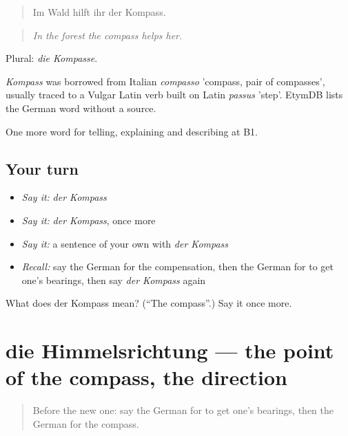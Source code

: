 \begin{quote}
Im Wald hilft ihr der Kompass.
\end{quote}

\begin{quote}
\emph{In the forest the compass helps her.}
\end{quote}

Plural: \emph{die Kompasse}.

\begin{cousinweb}
\emph{Kompass} was borrowed from Italian \emph{compasso} 'compass, pair of compasses', usually traced to a Vulgar Latin verb built on Latin \emph{passus} 'step'. EtymDB lists the German word without a source.
\end{cousinweb}

\begin{grammarlens}[title={What you've built}]
One more word for telling, explaining and describing at B1.
\end{grammarlens}

\subsection*{Your turn}
\begin{itemize}
\raggedright
  \item \emph{Say it:} \emph{der Kompass}
  \item \emph{Say it:} \emph{der Kompass}, once more
  \item \emph{Say it:} a sentence of your own with \emph{der Kompass}
  \item \emph{Recall:} say the German for the compensation, then the German for to get one's bearings, then say \emph{der Kompass} again
\end{itemize}

\begin{tcolorbox}[breakable,colback=teal!4,colframe=teal!35!black,title={Before you move on}]
What does der Kompass mean? (\textquotedblleft{}The compass\textquotedblright{}.) Say it once more.
\end{tcolorbox}
\section[die Himmelsrichtung]{die Himmelsrichtung — the point of the compass, the direction}

\label{lesson:GE-C433-himmelsrichtung}



\begin{quote}
Before the new one: say the German for to get one's bearings, then the German for the compass.
\end{quote}

